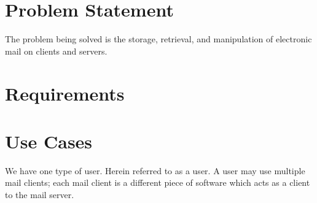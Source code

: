 \documentclass[a4paper,12pt]{article}
\begin{document}

\section*{Problem Statement}

The problem being solved is the storage, retrieval, and manipulation of electronic mail on clients and servers.

\section*{Requirements}

\section*{Use Cases}

We have one type of user. Herein referred to as a user. A user may use multiple mail clients; each mail client is a different piece of software which acts as a client to the mail server.
\end{document}
